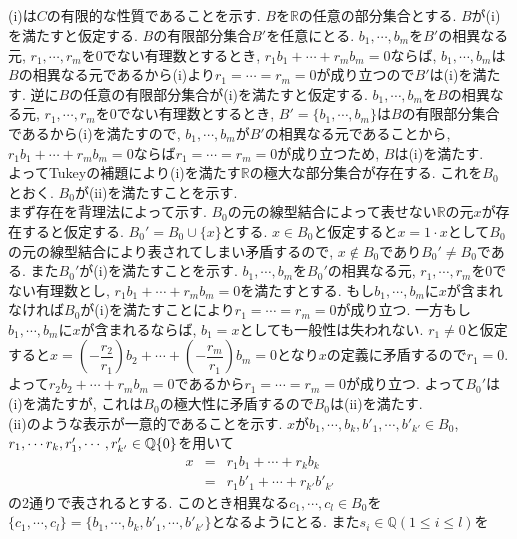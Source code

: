 \documentclass{jsarticle}
\begin{document}
\subsection{} %
(i)は$C$の有限的な性質であることを示す. $B$を$\mathbb{R}$の任意の部分集合とする. $B$が(i)を満たすと仮定する. $B$の有限部分集合$B'$を任意にとる. $b_1, \cdots, b_m$を$B'$の相異なる元, $r_1, \cdots, r_m$を0でない有理数とするとき, $r_1 b_1 + \cdots + r_m b_m = 0$ならば, $b_1, \cdots, b_m$は$B$の相異なる元であるから(i)より$r_1 = \cdots = r_m = 0$が成り立つので$B'$は(i)を満たす. 逆に$B$の任意の有限部分集合が(i)を満たすと仮定する. $b_1, \cdots, b_m$を$B$の相異なる元, $r_1, \cdots, r_m$を0でない有理数とするとき, $B' = \{b_1, \cdots, b_m\}$は$B$の有限部分集合であるから(i)を満たすので, $b_1, \cdots, b_m$が$B'$の相異なる元であることから, $r_1 b_1 + \cdots + r_m b_m = 0$ならば$r_1 = \cdots = r_m = 0$が成り立つため, $B$は(i)を満たす.\\
よってTukeyの補題により(i)を満たす$\mathbb{R}$の極大な部分集合が存在する. これを$B_0$とおく. $B_0$が(ii)を満たすことを示す.\\
まず存在を背理法によって示す. $B_0$の元の線型結合によって表せない$\mathbb{R}$の元$x$が存在すると仮定する. $B_0' = B_0 \cup \{x\}$とする. $x \in B_0$と仮定すると$x = 1 \cdot x$として$B_0$の元の線型結合により表されてしまい矛盾するので, $x \notin B_0$であり$B_0' \neq B_0$である. また$B_0'$が(i)を満たすことを示す. $b_1, \cdots, b_m$を$B_0'$の相異なる元, $r_1, \cdots, r_m$を0でない有理数とし, $r_1 b_1 + \cdots + r_m b_m = 0$を満たすとする. もし$b_1, \cdots, b_m$に$x$が含まれなければ$B_0$が(i)を満たすことにより$r_1 = \cdots = r_m = 0$が成り立つ. 一方もし$b_1, \cdots, b_m$に$x$が含まれるならば, $b_1 = x$としても一般性は失われない. $r_1 \neq 0$と仮定すると$x = \left(-\dfrac{r_2}{r_1}\right) b_2 + \cdots + \left(-\dfrac{r_m}{r_1}\right) b_m = 0$となり$x$の定義に矛盾するので$r_1 = 0$. よって$r_2 b_2 + \cdots + r_m b_m = 0$であるから$r_1 = \cdots = r_m = 0$が成り立つ. よって$B_0'$は(i)を満たすが, これは$B_0$の極大性に矛盾するので$B_0$は(ii)を満たす.\\
(ii)のような表示が一意的であることを示す. $x$が$b_1, \cdots, b_k, b'_1, \cdots, b'_{k'} \in B_0$, $r_1, \cdots r_k, r'_1, \cdots, r'_{k'} \in \mathbb{Q}\\\{0\}$を用いて
\begin{eqnarray*}
	x
	&=& r_1 b_1 + \cdots + r_k b_k\\
	&=& r_1 b'_1 + \cdots + r_{k'} b'_{k'}
\end{eqnarray*}
の2通りで表されるとする. このとき相異なる$c_1, \cdots, c_l \in B_0$を$\{c_1, \cdots, c_l\} = \{b_1, \cdots, b_k, b'_1, \cdots, b'_{k'}\}$となるようにとる. また$s_i \in \mathbb{Q} (1 \le i \le l)$を
\end{document}
